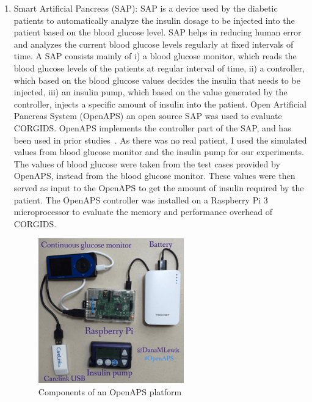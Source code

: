 \begin{enumerate}
\item Smart Artificial Pancreas (SAP): SAP is a device used by the diabetic patients to automatically analyze the insulin dosage to be injected into the patient based on the blood glucose level. SAP helps in reducing human error and analyzes the current blood glucose levels regularly at fixed intervals of time. A SAP consists mainly of i) a blood glucose monitor, which reads the blood glucose levels of the patients at regular interval of time, ii) a controller, which based on the blood glucose values decides the insulin that needs to be injected, iii) an insulin pump, which based on the value generated by the controller, injects a specific amount of insulin into the patient. Open Artificial Pancreas System (OpenAPS) an open source SAP was used to evaluate CORGIDS. OpenAPS implements the controller part of the SAP, and has been used in prior studies~\cite{aliabadi2017artinali}. As there was no real patient, I used the simulated values from blood glucose monitor and the insulin pump for our experiments. The values of blood glucose  were taken from the test cases provided by OpenAPS, instead from the blood glucose monitor. These values were then served as input to the OpenAPS to get the amount of insulin required by the patient. The OpenAPS controller was installed on a Raspberry Pi 3 microprocessor to evaluate the memory and performance overhead of CORGIDS.

\begin{figure}[ht]
    \centering
    \includegraphics[scale=0.55,keepaspectratio = true]{Graphics/openaps.png}
    \caption{Components of an OpenAPS platform}
    \label{fig:OpenAPS}
\end{figure}
\end{enumerate}

